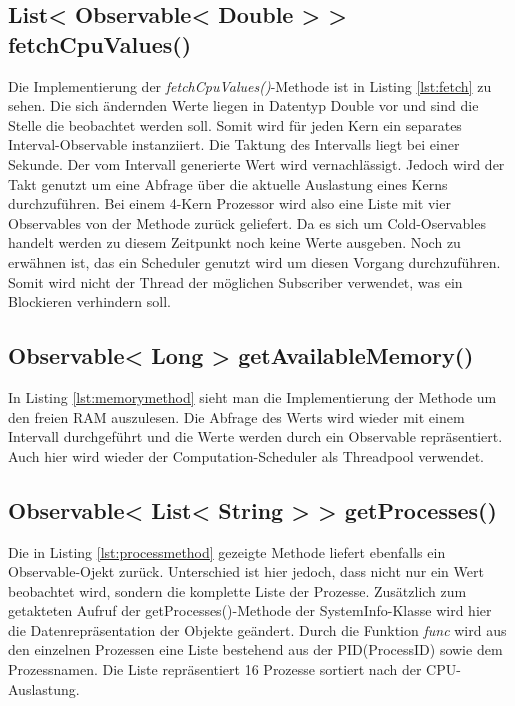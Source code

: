 \subsection{List< Observable< Double > > fetchCpuValues()}
 
Die Implementierung der \textit{fetchCpuValues()}-Methode ist in Listing \ref{lst:fetch} zu sehen. Die sich ändernden Werte liegen in Datentyp Double vor und sind die Stelle die beobachtet werden soll. Somit wird für jeden Kern ein separates Interval-Observable instanziiert. Die Taktung des Intervalls liegt bei einer Sekunde. Der vom Intervall generierte Wert wird vernachlässigt. Jedoch wird der Takt genutzt um eine Abfrage über die aktuelle Auslastung eines Kerns durchzuführen. Bei einem 4-Kern Prozessor wird also eine Liste mit vier Observables von der Methode zurück geliefert. Da es sich um Cold-Oservables handelt werden zu diesem Zeitpunkt noch keine Werte ausgeben. Noch zu erwähnen ist, das ein Scheduler genutzt wird um diesen Vorgang durchzuführen. Somit wird nicht der Thread der möglichen Subscriber verwendet, was ein Blockieren verhindern soll. 
\subsection{Observable< Long > getAvailableMemory()}
 
In Listing \ref{lst:memorymethod} sieht man die Implementierung der Methode um den freien RAM auszulesen. Die Abfrage des Werts wird wieder mit einem Intervall durchgeführt und die Werte werden durch ein Observable repräsentiert. Auch hier wird wieder der Computation-Scheduler als Threadpool verwendet.
\subsection{Observable< List< String > > getProcesses()}
 
Die in Listing \ref{lst:processmethod} gezeigte Methode liefert ebenfalls ein Observable-Ojekt zurück. Unterschied ist hier jedoch, dass nicht nur ein Wert beobachtet wird, sondern die komplette Liste der Prozesse. Zusätzlich zum getakteten Aufruf der getProcesses()-Methode der SystemInfo-Klasse wird hier die Datenrepräsentation der Objekte geändert. Durch die Funktion \textit{func} wird aus den einzelnen Prozessen eine Liste bestehend aus der PID(ProcessID) sowie dem Prozessnamen. Die Liste repräsentiert 16 Prozesse sortiert nach der CPU-Auslastung.
